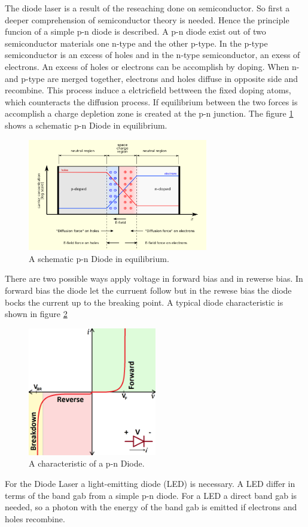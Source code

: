 The diode laser is a result of the reseaching done on semiconductor.
So first a deeper comprehension of semiconductor theory is needed.
Hence the principle funcion of a simple p-n diode is described.
A p-n diode exist out of two semiconductor materials one
n-type and the other p-type.
In the p-type semiconductor is an excess of holes
and in the n-type semiconductor, an exess of electrons.
An excess of holes or electrons can be accomplish by doping.
When n- and p-type are merged together,
electrons and holes diffuse in opposite side and recombine.
This process induce a elctricfield bettween the fixed doping atoms, which
counteracts the diffusion process.
If equilibrium between the two forces is accomplish
a charge depletion zone is created
at the p-n junction.
The figure \ref{fig:equi} shows
a schematic p-n Diode in equilibrium.

\begin{figure}
\centering
\includegraphics[width=0.7\textwidth]{equilibrium.png}
\caption{A schematic p-n Diode in equilibrium.
\cite{wiki_diode}}
\label{fig:equi}
\end{figure}

There are two possible ways apply voltage
in forward bias and
in rewerse bias.
In forward bias the diode let the curruent follow
but in the rewese bias the diode bocks the current up to the breaking point.
A typical diode characteristic is shown in figure \ref{fig:chara}
\begin{figure}
\centering
\includegraphics[width=0.5\textwidth]{Kennlinie.png}
\caption{A characteristic of a p-n Diode.
\cite{sparkfun}} %
\label{fig:chara}
\end{figure}
For the Diode Laser a light-emitting diode (LED)
is necessary. A LED differ in terms of
the band gab
from a simple p-n diode.
For a LED a direct band gab is needed, so a photon
with the energy of the band gab is
emitted if electrons and holes recombine.

